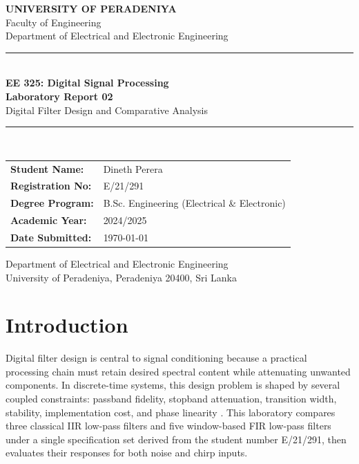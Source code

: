 \documentclass[12pt, a4paper]{article}
\begin{document}
\begin{titlepage}
  \begin{center}
    \vspace*{1cm}
    {\large \textbf{UNIVERSITY OF PERADENIYA}} \\[0.3cm]
    {\large Faculty of Engineering} \\[0.3cm]
    {\large Department of Electrical and Electronic Engineering} \\[2cm]

    \rule{\linewidth}{0.5mm} \\[0.4cm]
    {\LARGE \textbf{EE 325: Digital Signal Processing}} \\[0.3cm]
    {\Large \textbf{Laboratory Report 02}} \\[0.3cm]
    {\Large Digital Filter Design and Comparative Analysis} \\[0.2cm]
    \rule{\linewidth}{0.5mm} \\[2cm]

    \begin{tabular}{ll}
      \textbf{Student Name:}    & Dineth Perera \\[0.2cm]
      \textbf{Registration No:} & E/21/291 \\[0.2cm]
      \textbf{Degree Program:}  & B.Sc. Engineering (Electrical \& Electronic) \\[0.2cm]
      \textbf{Academic Year:}   & 2024/2025 \\[0.2cm]
      \textbf{Date Submitted:}  & \today \\[0.2cm]
    \end{tabular}

    \vfill
    {\small Department of Electrical and Electronic Engineering \\
    University of Peradeniya, Peradeniya 20400, Sri Lanka}
  \end{center}
\end{titlepage}

\clearpage
{}
\tableofcontents
\newpage

\section{Introduction}
Digital filter design is central to signal conditioning because a practical processing chain must retain desired spectral content while attenuating unwanted components. In discrete-time systems, this design problem is shaped by several coupled constraints: passband fidelity, stopband attenuation, transition width, stability, implementation cost, and phase linearity \cite{oppenheim2010, proakis2007, mitra2011}. This laboratory compares three classical IIR low-pass filters and five window-based FIR low-pass filters under a single specification set derived from the student number E/21/291, then evaluates their responses for both noise and chirp inputs.
\end{document}
